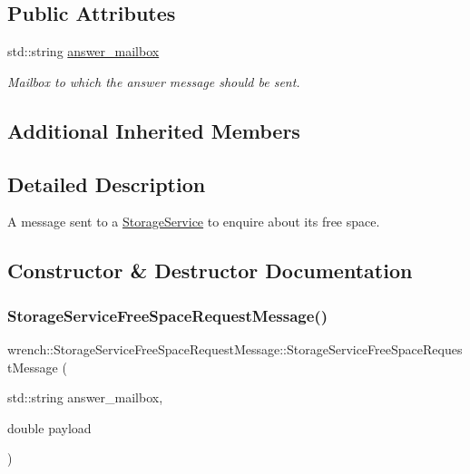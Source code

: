 \subsection*{Public Attributes}
\begin{DoxyCompactItemize}
\item 
\mbox{\label{classwrench_1_1_storage_service_free_space_request_message_a111e422cad53e2b66d517633a3c0f039}} 
std\+::string \hyperlink{classwrench_1_1_storage_service_free_space_request_message_a111e422cad53e2b66d517633a3c0f039}{answer\+\_\+mailbox}
\begin{DoxyCompactList}\small\item\em Mailbox to which the answer message should be sent. \end{DoxyCompactList}\end{DoxyCompactItemize}
\subsection*{Additional Inherited Members}


\subsection{Detailed Description}
A message sent to a \hyperlink{classwrench_1_1_storage_service}{Storage\+Service} to enquire about its free space. 

\subsection{Constructor \& Destructor Documentation}
\mbox{\label{classwrench_1_1_storage_service_free_space_request_message_a1957e84f48e23a69d833de429a908681}} 
\subsubsection{\texorpdfstring{Storage\+Service\+Free\+Space\+Request\+Message()}{StorageServiceFreeSpaceRequestMessage()}}
{\footnotesize\ttfamily wrench\+::\+Storage\+Service\+Free\+Space\+Request\+Message\+::\+Storage\+Service\+Free\+Space\+Request\+Message (\begin{DoxyParamCaption}\item[{std\+::string}]{answer\+\_\+mailbox,  }\item[{double}]{payload }\end{DoxyParamCaption})}



